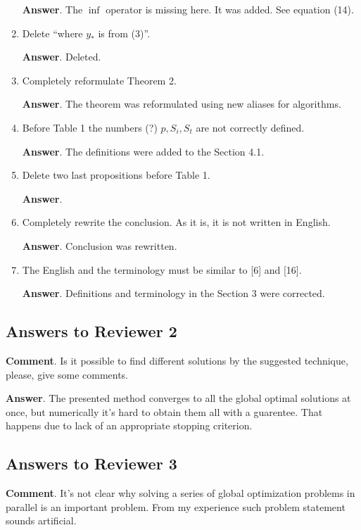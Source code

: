 \documentclass{article}%
\begin{document}
\begin{enumerate}
\textbf{Answer}.
The $\inf$ operator is missing here. It was added. See equation (14).

\item  Delete “where $y_*$ is from (3)”.

\textbf{Answer}.
Deleted.

\item  Completely reformulate Theorem 2.

\textbf{Answer}.
The theorem was reformulated using new aliases for algorithms.

\item  Before Table 1 the numbers (?) $p, S_i, S_t$ are not correctly defined.

\textbf{Answer}.
The definitions were added to the Section 4.1.

\item  Delete two last propositions before Table 1.

\textbf{Answer}.

\item  Completely rewrite the conclusion. As it is, it is not written in English.

\textbf{Answer}.
Conclusion was rewritten.

\item  The English and the terminology must be similar to [6] and [16].

\textbf{Answer}.
Definitions and terminology in the Section 3 were corrected.

\end{enumerate}



\subsection*{Answers to Reviewer 2}

\textbf{Comment}. Is it possible to find different solutions by the suggested technique, please, give some comments.

\textbf{Answer}.
The presented method converges to all the global optimal solutions at once, but numerically it's hard
to obtain them all with a guarentee. That happens due to lack of an appropriate stopping criterion.


\subsection*{Answers to Reviewer 3}

\textbf{Comment}. It's not clear why solving a series of global optimization problems in parallel is an important problem. From my experience such problem statement sounds artificial.
\end{document}
